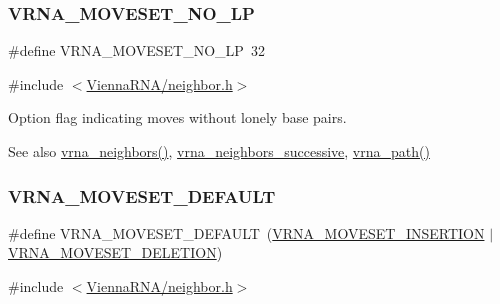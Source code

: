 \subsubsection{\texorpdfstring{V\+R\+N\+A\+\_\+\+M\+O\+V\+E\+S\+E\+T\+\_\+\+N\+O\+\_\+\+LP}{VRNA\_MOVESET\_NO\_LP}}
{\footnotesize\ttfamily \#define V\+R\+N\+A\+\_\+\+M\+O\+V\+E\+S\+E\+T\+\_\+\+N\+O\+\_\+\+LP~32}



{\ttfamily \#include $<$\hyperlink{neighbor_8h}{Vienna\+R\+N\+A/neighbor.\+h}$>$}



Option flag indicating moves without lonely base pairs. 

\begin{DoxySeeAlso}{See also}
\hyperlink{group__neighbors_gab1473d856b15da2120fe648977798ad5}{vrna\+\_\+neighbors()}, \hyperlink{group__neighbors_gae5aaa1c5a1f22e889843f3edbdd04714}{vrna\+\_\+neighbors\+\_\+successive}, \hyperlink{group__paths_gab6aee4143f8b103518d5cbfe6bfe5eae}{vrna\+\_\+path()} 
\end{DoxySeeAlso}
\mbox{\label{group__neighbors_gaa5ffec4dd0d02df320f123e6888154d1}} 
\subsubsection{\texorpdfstring{V\+R\+N\+A\+\_\+\+M\+O\+V\+E\+S\+E\+T\+\_\+\+D\+E\+F\+A\+U\+LT}{VRNA\_MOVESET\_DEFAULT}}
{\footnotesize\ttfamily \#define V\+R\+N\+A\+\_\+\+M\+O\+V\+E\+S\+E\+T\+\_\+\+D\+E\+F\+A\+U\+LT~(\hyperlink{group__neighbors_gaf39028db9c70d3be528929182a3f2d5a}{V\+R\+N\+A\+\_\+\+M\+O\+V\+E\+S\+E\+T\+\_\+\+I\+N\+S\+E\+R\+T\+I\+ON} $\vert$ \hyperlink{group__neighbors_gac05db9392c6647e3e9a6982096c5b384}{V\+R\+N\+A\+\_\+\+M\+O\+V\+E\+S\+E\+T\+\_\+\+D\+E\+L\+E\+T\+I\+ON})}



{\ttfamily \#include $<$\hyperlink{neighbor_8h}{Vienna\+R\+N\+A/neighbor.\+h}$>$}



